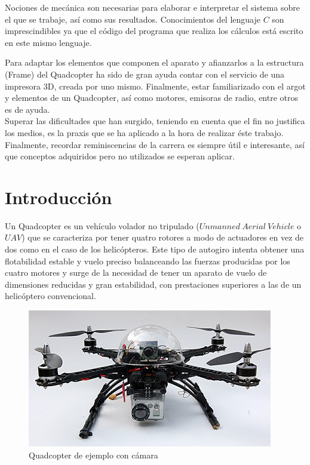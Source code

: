 \documentclass[twoside,11pt]{report}
\begin{document}
Nociones de mecánica son necesarias para elaborar e interpretar el sistema sobre el que se trabaje, así como sus resultados. Conocimientos del lenguaje $C$ son imprescindibles ya que el código del programa que realiza los cálculos está escrito en este mismo lenguaje. 

Para adaptar los elementos que componen el aparato y afianzarlos a la estructura (Frame)  del Quadcopter ha sido de gran ayuda contar con el servicio de una impresora 3D, creada por uno mismo. Finalmente, estar familiarizado con el argot y elementos de un Quadcopter, así como motores, emisoras de radio, entre otros es de ayuda. \\

Superar las dificultades que han surgido, teniendo en cuenta que el fin no justifica los medios, es la praxis que se ha aplicado a la hora de realizar éste trabajo. Finalmente, recordar reminiscencias de la carrera es siempre útil e interesante, así que conceptos adquiridos pero no utilizados se esperan aplicar.
 
\newpage
\chapter{Introducción} \label{intro}

Un Quadcopter es un vehículo volador no tripulado ($Unmanned \>Aerial\>Vehicle$ o $UAV$) que se caracteriza por tener quatro rotores a modo de actuadores en vez de dos como en el caso de los helicópteros. Este tipo de autogiro intenta obtener una flotabilidad estable y vuelo preciso balanceando las fuerzas producidas por los cuatro motores y surge de la necesidad de tener un aparato de vuelo de dimensiones reducidas y gran estabilidad, con prestaciones superiores a las de un helicóptero convencional. \\

\begin{figure}[h!]
\begin{center}
\includegraphics[scale=0.4]{images/quadcopter_example.jpg}
\caption{Quadcopter de ejemplo con cámara}
\end{center}
\end{figure}
\end{document}
